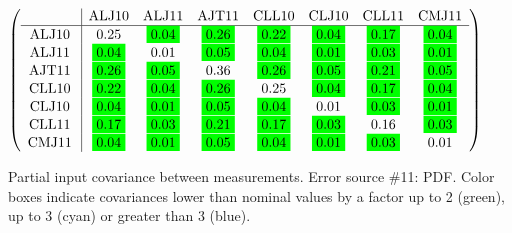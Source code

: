 \begin{table}[H]
\scriptsize
\begin{center}
\renewcommand{\arraystretch}{1.1}
\begin{math}\left(\begin{array}{c|ccccccc}
 & \mathrm{ALJ10} & 
\mathrm{ALJ11} & 
\mathrm{AJT11} & 
\mathrm{CLL10} & 
\mathrm{CLJ10} & 
\mathrm{CLL11} & 
\mathrm{CMJ11} \\
\hline
\mathrm{ALJ10} \hspace*{2pt} &       0.25 &  \colorbox{Green1}{$      0.04$} &  \colorbox{Green1}{$      0.26$} &  \colorbox{Green1}{$      0.22$} &  \colorbox{Green1}{$      0.04$} &  \colorbox{Green1}{$      0.17$} &  \colorbox{Green1}{$      0.04$} \\
\mathrm{ALJ11} \hspace*{2pt} &  \colorbox{Green1}{$      0.04$} &       0.01 &  \colorbox{Green1}{$      0.05$} &  \colorbox{Green1}{$      0.04$} &  \colorbox{Green1}{$      0.01$} &  \colorbox{Green1}{$      0.03$} &  \colorbox{Green1}{$      0.01$} \\
\mathrm{AJT11} \hspace*{2pt} &  \colorbox{Green1}{$      0.26$} &  \colorbox{Green1}{$      0.05$} &       0.36 &  \colorbox{Green1}{$      0.26$} &  \colorbox{Green1}{$      0.05$} &  \colorbox{Green1}{$      0.21$} &  \colorbox{Green1}{$      0.05$} \\
\mathrm{CLL10} \hspace*{2pt} &  \colorbox{Green1}{$      0.22$} &  \colorbox{Green1}{$      0.04$} &  \colorbox{Green1}{$      0.26$} &       0.25 &  \colorbox{Green1}{$      0.04$} &  \colorbox{Green1}{$      0.17$} &  \colorbox{Green1}{$      0.04$} \\
\mathrm{CLJ10} \hspace*{2pt} &  \colorbox{Green1}{$      0.04$} &  \colorbox{Green1}{$      0.01$} &  \colorbox{Green1}{$      0.05$} &  \colorbox{Green1}{$      0.04$} &       0.01 &  \colorbox{Green1}{$      0.03$} &  \colorbox{Green1}{$      0.01$} \\
\mathrm{CLL11} \hspace*{2pt} &  \colorbox{Green1}{$      0.17$} &  \colorbox{Green1}{$      0.03$} &  \colorbox{Green1}{$      0.21$} &  \colorbox{Green1}{$      0.17$} &  \colorbox{Green1}{$      0.03$} &       0.16 &  \colorbox{Green1}{$      0.03$} \\
\mathrm{CMJ11} \hspace*{2pt} &  \colorbox{Green1}{$      0.04$} &  \colorbox{Green1}{$      0.01$} &  \colorbox{Green1}{$      0.05$} &  \colorbox{Green1}{$      0.04$} &  \colorbox{Green1}{$      0.01$} &  \colorbox{Green1}{$      0.03$} &       0.01 \\
\end{array}\right)\end{math}
\caption{Partial input covariance between measurements. Error source \#11: PDF. Color boxes indicate covariances lower than nominal values by a factor up to 2 (green), up to 3 (cyan) or greater than 3 (blue).}
\renewcommand{\arraystretch}{1}
\end{center}
\end{table}
